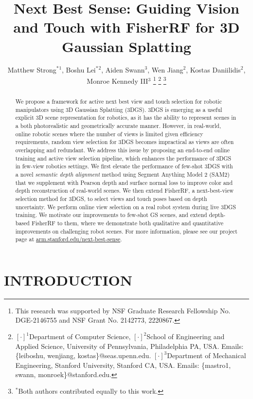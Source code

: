 \documentclass[letterpaper, 10 pt, conference]{ieeeconf}  %
\title{\LARGE \bf
 Next Best Sense: Guiding Vision and Touch with FisherRF for 3D Gaussian Splatting}
\author{Matthew Strong$^{\ast}{}^{1}$, Boshu Lei$^{\ast}{}^{2}$, Aiden Swann$^{3}$, Wen Jiang$^{2}$, Kostas Daniilidis$^{2}$, Monroe Kennedy III$^{3}$%
\thanks{This research was supported by NSF Graduate Research Fellowship No.
DGE-2146755 and NSF Grant No. 2142773, 2220867.}%
\thanks{$[\cdot]^{1} $Department of Computer Science,
$[\cdot]^{2}$School of Engineering and Applied Science, University of Pennsylvania, Philadelphia PA, USA. Emails: \{leiboshu, wenjiang, kostas\}@seas.upenn.edu.
$[\cdot]^{3}$Department of Mechanical Engineering,
        Stanford University, Stanford CA, USA.
        Emails: \{mastro1, swann, monroek\}@stanford.edu.
}
\thanks{$^\ast$Both authors contributed equally to this work.}
}
\begin{document}
\maketitle
\thispagestyle{empty}


\begin{abstract}
We propose a framework for active next best view and touch selection for robotic manipulators using 3D Gaussian Splatting (3DGS). 3DGS is emerging as a useful explicit 3D scene representation for robotics, as it has the ability to represent scenes in a both photorealistic and geometrically accurate manner. However, in real-world, online robotic scenes where the number of views is limited given efficiency requirements, random view selection for 3DGS becomes impractical as views are often overlapping and redundant. We address this issue by proposing an end-to-end online training and active view selection pipeline, which enhances the performance of 3DGS in few-view robotics settings. We first elevate the performance of few-shot 3DGS with a novel \textit{semantic depth alignment} method using Segment Anything Model 2 (SAM2) that we supplement with Pearson depth and surface normal loss to improve color and depth reconstruction of real-world scenes. We then extend FisherRF, a next-best-view selection method for 3DGS, to select views and touch poses based on depth uncertainty. We perform online view selection on a real robot system during live 3DGS training.  We motivate our improvements to few-shot GS scenes, and extend depth-based FisherRF to them, where we demonstrate both qualitative and quantitative improvements on challenging robot scenes. For more information, please see our project page at \href{https://arm.stanford.edu/next-best-sense}{arm.stanford.edu/next-best-sense}.
\end{abstract}




\section{INTRODUCTION}
 
\end{document}
